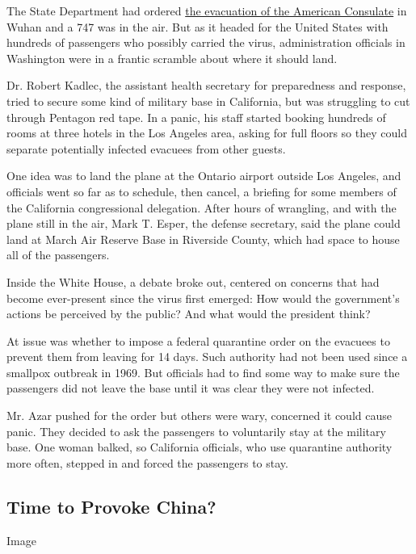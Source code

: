The State Department had ordered
\href{https://www.nytimes3xbfgragh.onion/2020/01/29/world/asia/wuhan-china-coronavirus-evacuations.html}{the
evacuation of the American Consulate} in Wuhan and a 747 was in the air.
But as it headed for the United States with hundreds of passengers who
possibly carried the virus, administration officials in Washington were
in a frantic scramble about where it should land.

Dr. Robert Kadlec, the assistant health secretary for preparedness and
response, tried to secure some kind of military base in California, but
was struggling to cut through Pentagon red tape. In a panic, his staff
started booking hundreds of rooms at three hotels in the Los Angeles
area, asking for full floors so they could separate potentially infected
evacuees from other guests.

One idea was to land the plane at the Ontario airport outside Los
Angeles, and officials went so far as to schedule, then cancel, a
briefing for some members of the California congressional delegation.
After hours of wrangling, and with the plane still in the air, Mark T.
Esper, the defense secretary, said the plane could land at March Air
Reserve Base in Riverside County, which had space to house all of the
passengers.

Inside the White House, a debate broke out, centered on concerns that
had become ever-present since the virus first emerged: How would the
government's actions be perceived by the public? And what would the
president think?

At issue was whether to impose a federal quarantine order on the
evacuees to prevent them from leaving for 14 days. Such authority had
not been used since a smallpox outbreak in 1969. But officials had to
find some way to make sure the passengers did not leave the base until
it was clear they were not infected.

Mr. Azar pushed for the order but others were wary, concerned it could
cause panic. They decided to ask the passengers to voluntarily stay at
the military base. One woman balked, so California officials, who use
quarantine authority more often, stepped in and forced the passengers to
stay.

\hypertarget{time-to-provoke-china}{%
\subsection{Time to Provoke China?}\label{time-to-provoke-china}}

Image

